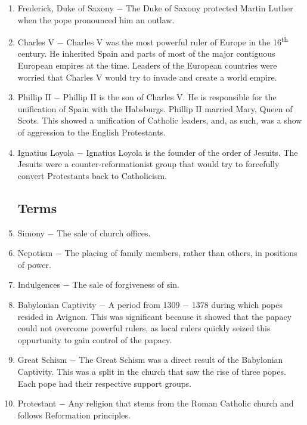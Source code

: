 \documentclass[12pt]{article}
\begin{document}
\begin{enumerate}
\item Frederick, Duke of Saxony $-$ The Duke of Saxony protected Martin Luther when the pope pronounced him an outlaw.

\item Charles V $-$ Charles V was the most powerful ruler of Europe in the 16\textsuperscript{th} century. He inherited Spain and parts of most of the major contiguous European empires at the time. Leaders of the European countries were worried that Charles V would try to invade and create a world empire.

\item Phillip II $-$ Phillip II is the son of Charles V. He is responsible for the unification of Spain with the Habsburgs. Phillip II married Mary, Queen of Scots. This showed a unification of Catholic leaders, and, as such, was a show of aggression to the English Protestants.

\item Ignatius Loyola $-$ Ignatius Loyola is the founder of the order of Jesuits. The Jesuits were a counter-reformationist group that would try to forcefully convert Protestants back to Catholicism.

\subsection{Terms}

\item Simony $-$ The sale of church offices.

\item Nepotism $-$ The placing of family members, rather than others, in positions of power.

\item Indulgences $-$ The sale of forgiveness of sin.

\item Babylonian Captivity $-$ A period from 1309 $-$ 1378 during which popes resided in Avignon. This was significant because it showed that the papacy could not overcome powerful rulers, as local rulers quickly seized this oppurtunity to gain control of the papacy.

\item Great Schism $-$ The Great Schism was a direct result of the Babylonian Captivity. This was a split in the church that saw the rise of three popes. Each pope had their respective support groups.

\item Protestant $-$ Any religion that stems from the Roman Catholic church and follows Reformation principles.


\end{enumerate}
\end{document}
